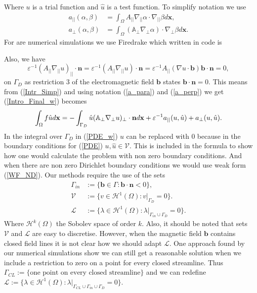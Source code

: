 \documentclass[12pt]{ociamthesis}
\begin{document}
Where $u$ is a trial function and $\hat{u}$ is a test function. To simplify notation we use
\begin{align} \label{a_para}
a_{||}(\alpha, \beta) &= \int_{\Omega} A_{||} \nabla_{||}\alpha \cdot \nabla_{||}\beta d\mathbf{x}, \\ \label{a_perp}
a_{\perp}(\alpha, \beta) &= \int_{\Omega}(\mathbb{A}_{\perp} \nabla_{\perp}\alpha )\cdot \nabla_{\perp} \beta d\mathbf{x}.
\end{align}
For are numerical simulations we use Firedrake \cite{Dragon} which written in code is 

Also, we have 
\begin{equation} \label{Intr_Simp}
\varepsilon^{-1} (A_{||}\nabla_{||}u)_{||}\cdot \mathbf{n} = \varepsilon^{-1} (A_{||}\nabla_{||}u)\cdot \mathbf{n} = \varepsilon^{-1} A_{||}(\nabla u \cdot \mathbf{b}) \mathbf{b} \cdot \mathbf{n} = 0,
\end{equation}
on $\Gamma_D$ as restriction $3$ of the electromagnetic field $\mathbf{b}$ states $\mathbf{b}\cdot \mathbf{n}=0$. This means from (\ref{Intr_Simp}) and using notation (\ref{a_para}) and (\ref{a_perp}) we get (\ref{Intro_Final_w}) becomes
\begin{equation} \label{PDE_w}
\int_{\Omega}f\hat{u}d\mathbf{x} = -\int_{\Gamma_D}\hat{u}(\mathbb{A}_{\perp}\nabla_{\perp} u)_{\perp}\cdot \mathbf{n} d \mathbf{x} + 
\varepsilon^{-1} a_{||}(u,\hat{u})+a_{\perp}(u, \hat{u}).\\
\end{equation}
In the integral over $\Gamma_D$ in (\ref{PDE_w}) $u$ can be replaced with $0$ because in the boundary conditions for (\ref{PDE}) $u,\hat{u} \in \mathcal{V}$. This is included in the formula to show how one would calculate the problem with non zero boundary conditions. And when there are non zero Dirichlet boundary conditions we would use weak form (\ref{WF_ND}).
Our methods require the use of the sets 
\begin{align}
\Gamma_{in} &:= \{\mathbf{b} \in \Gamma : \mathbf{b} \cdot \mathbf{n} < 0\}, \\
\mathcal{V} &:= \{v \in \mathcal{H}^1(\Omega) : v|_{\Gamma_{D}} = 0\}. \\
\mathcal{L} &:= \{\lambda \in \mathcal{H}^1(\Omega) : \lambda |_{\Gamma_{in}\cup \Gamma_{D}} = 0\}.
\end{align}
Where $\mathcal{H}^k(\Omega)$ the Sobolev space of order $k$. Also, it should be noted that sets $\mathcal{V}$ and $\mathcal{L}$ are easy to discretise. However, when the magnetic field $\mathbf{b}$ contains closed field lines it is not clear how we should adapt $\mathcal{L}$. One approach found by our numerical simulations show we can still get a reasonable solution when we include a restriction to zero on a point for every closed streamline. Thus $\Gamma_{CL} := \{\text{one point on every closed streamline}\}$ and we can redefine $\mathcal{L} := \{\lambda \in \mathcal{H}^1(\Omega) : \lambda |_{\Gamma_{CL}\cup \Gamma_{in}\cup \Gamma_{D}} = 0\}$.
\end{document}
